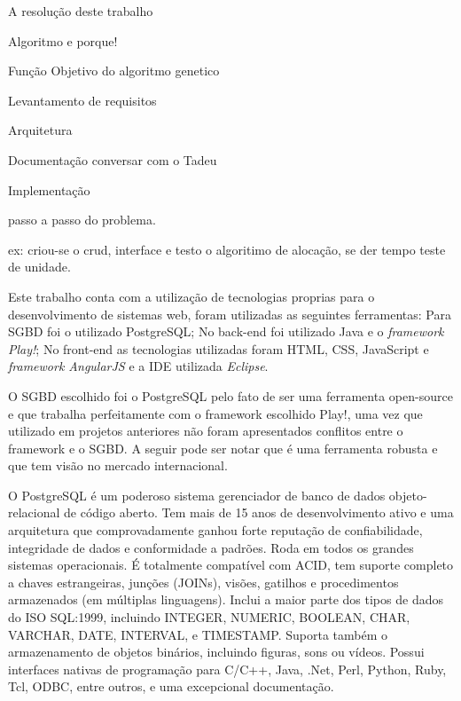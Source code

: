 

A resolução deste trabalho

Algoritmo e porque!

Função Objetivo do algoritmo genetico

Levantamento de requisitos

Arquitetura

Documentação conversar com o Tadeu

Implementação

passo a passo do problema.

ex: criou-se o crud, interface e testo o algoritimo de alocação, se der tempo teste de unidade.


Este trabalho conta com a utilização de tecnologias proprias para o desenvolvimento de sistemas web, foram utilizadas as seguintes ferramentas: Para SGBD foi o utilizado PostgreSQL; No back-end foi utilizado Java e o \textit{framework Play!}; No front-end as tecnologias utilizadas foram HTML, CSS, JavaScript e \textit{framework AngularJS} e a IDE utilizada \textit{Eclipse}.\par


O SGBD escolhido foi o PostgreSQL pelo fato de ser uma ferramenta open-source e que trabalha perfeitamente com o framework escolhido Play!, uma vez que utilizado em projetos anteriores não foram apresentados conflitos entre o framework e o SGBD. A seguir pode ser notar que é uma ferramenta robusta e que tem visão no mercado internacional.\par

O PostgreSQL é um poderoso sistema gerenciador de banco de dados objeto-relacional de código aberto.  Tem mais de 15 anos de desenvolvimento ativo e uma arquitetura que comprovadamente ganhou forte reputação de confiabilidade, integridade de dados e conformidade a padrões.  Roda em todos os grandes sistemas operacionais. É totalmente compatível com ACID, tem suporte completo a chaves estrangeiras, junções (JOINs), visões, gatilhos e procedimentos armazenados (em múltiplas linguagens).  Inclui a maior parte dos tipos de dados do ISO SQL:1999, incluindo INTEGER, NUMERIC, BOOLEAN, CHAR, VARCHAR, DATE, INTERVAL, e TIMESTAMP.  Suporta também o armazenamento de objetos binários, incluindo figuras, sons ou vídeos.  Possui interfaces nativas de programação para C/C++, Java, .Net, Perl, Python, Ruby, Tcl, ODBC, entre outros, e uma excepcional documentação.\cite{postgresql}

